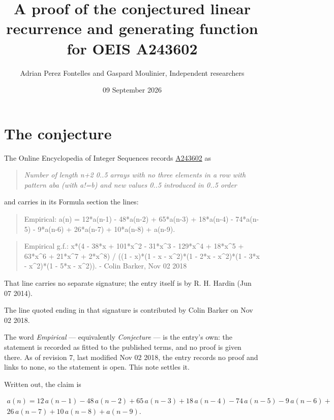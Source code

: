 \documentclass[11pt]{article}
\title{A proof of the conjectured linear recurrence and generating function for OEIS A243602}
\author{Adrian Perez Fontelles and Gaspard Moulinier, Independent researchers}
\date{09 September 2026}
\theoremstyle{definition}
\begin{document}
\maketitle
\section{The conjecture}

The Online Encyclopedia of Integer Sequences records \href{https://oeis.org/A243602}{A243602} as

\begin{quote}\itshape Number of length n+2 0..5 arrays with no three elements in a row with pattern aba (with a!=b) and new values 0..5 introduced in 0..5 order\end{quote}

and carries in its Formula section the lines:

\begin{quote}\ttfamily Empirical: a(n) = 12*a(n-1) - 48*a(n-2) + 65*a(n-3) + 18*a(n-4) - 74*a(n-5) - 9*a(n-6) + 26*a(n-7) + 10*a(n-8) + a(n-9).\end{quote}

\begin{quote}\ttfamily Empirical g.f.: x*(4 - 38*x + 101*x\textasciicircum{}2 - 31*x\textasciicircum{}3 - 129*x\textasciicircum{}4 + 18*x\textasciicircum{}5 + 63*x\textasciicircum{}6 + 21*x\textasciicircum{}7 + 2*x\textasciicircum{}8) / ((1 - x)*(1 - x - x\textasciicircum{}2)*(1 - 2*x - x\textasciicircum{}2)*(1 - 3*x - x\textasciicircum{}2)*(1 - 5*x - x\textasciicircum{}2)). - Colin Barker, Nov 02 2018\end{quote}

That line carries no separate signature; the entry itself is by R. H. Hardin (Jun 07 2014).

The line quoted ending in that signature is contributed by Colin Barker on Nov 02 2018.

The word {\itshape Empirical} --- equivalently {\itshape Conjecture} --- is the entry's own: the statement is recorded as fitted to the published terms, and no proof is given there. As of revision 7, last modified Nov 02 2018, the entry records no proof and links to none, so the statement is open. This note settles it.

Written out, the claim is

\begin{multline*} a(n) = 12\,a(n-1) - 48\,a(n-2) + 65\,a(n-3) + 18\,a(n-4) - 74\,a(n-5) - 9\,a(n-6) + \\ 26\,a(n-7) + 10\,a(n-8) + a(n-9). \end{multline*}
\end{document}
